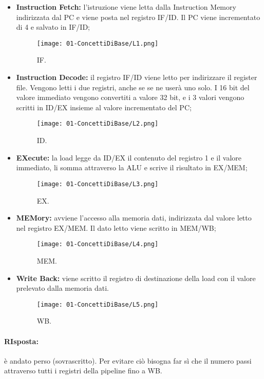 \begin{itemize}
  \item \textbf{Instruction Fetch:} l'istruzione viene letta dalla Instruction Memory indirizzata dal PC e viene posta nel registro IF/ID. Il PC viene incrementato di 4 e salvato in IF/ID;
    \begin{figure}[h]
    \centering
    \texttt{[image: 01-ConcettiDiBase/L1.png]}
    \caption{IF.}
\end{figure}
  \item \textbf{Instruction Decode:} il registro IF/ID viene letto per indirizzare il register file. Vengono letti i due registri, anche se se ne userà uno solo. I 16 bit del valore immediato vengono convertiti a valore 32 bit, e i 3 valori vengono scritti in ID/EX insieme al valore incrementato del PC;
    \begin{figure}[h]
    \centering
    \texttt{[image: 01-ConcettiDiBase/L2.png]}
    \caption{ID.}
\end{figure}
\pagebreak
\item \textbf{EXecute:} la load legge da ID/EX il contenuto del registro 1 e il valore immediato, li somma attraverso la ALU e scrive il risultato in EX/MEM;
    \begin{figure}[h]
    \centering
    \texttt{[image: 01-ConcettiDiBase/L3.png]}
    \caption{EX.}
\end{figure}
  \item \textbf{MEMory:} avviene l'accesso alla memoria dati, indirizzata dal valore letto nel registro EX/MEM. Il dato letto viene scritto in MEM/WB;
    \begin{figure}[h]
    \centering
    \texttt{[image: 01-ConcettiDiBase/L4.png]}
    \caption{MEM.}
\end{figure}
  \item \textbf{Write Back:} viene scritto il registro di destinazione della load con il valore prelevato dalla memoria dati.
    \begin{figure}[h]
    \centering
    \texttt{[image: 01-ConcettiDiBase/L5.png]}
    \caption{WB.}
\end{figure}

\end{itemize}
\pagebreak
{}

\paragraph{RIsposta:} è andato perso (sovrascritto). Per evitare ciò bisogna far sì che il numero passi attraverso tutti i registri della pipeline fino a WB.

